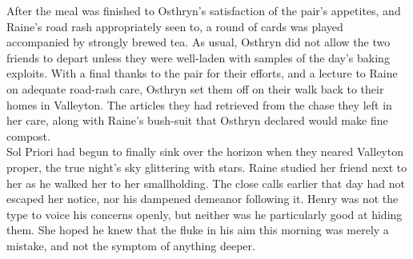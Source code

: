 After the meal was finished to Osthryn's satisfaction of the pair's appetites, and Raine's road rash appropriately seen to, a round of cards was played accompanied by strongly brewed tea.
As usual, Osthryn did not allow the two friends to depart unless they were well-laden with samples of the day's baking exploits.
With a final thanks to the pair for their efforts, and a lecture to Raine on adequate road-rash care, Osthryn set them off on their walk back to their homes in Valleyton.
The articles they had retrieved from the chase they left in her care, along with Raine's bush-suit that Osthryn declared would make fine compost.\\

Sol Priori had begun to finally sink over the horizon when they neared Valleyton proper, the true night's sky glittering with stars.
Raine studied her friend next to her as he walked her to her smallholding.
The close calls earlier that day had not escaped her notice, nor his dampened demeanor following it. 
Henry was not the type to voice his concerns openly, but neither was he particularly good at hiding them.
She hoped he knew that the fluke in his aim this morning was merely a mistake, and not the symptom of anything deeper.
